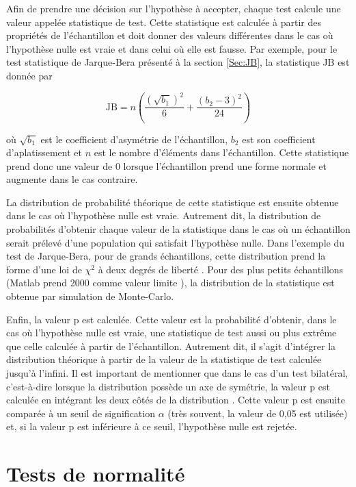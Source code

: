 \documentclass{article}       %
\begin{document}
Afin de prendre une décision sur l'hypothèse à accepter, chaque test calcule une valeur appelée statistique de test. Cette statistique est calculée à partir des propriétés de l'échantillon et doit donner des valeurs différentes dans le cas où l'hypothèse nulle est vraie et dans celui où elle est fausse. Par exemple, pour le test statistique de Jarque-Bera présenté à la section \ref{Sec:JB}, la statistique JB est donnée par \cite{GComp}

\begin{equation}
\label{JB}
    \text{JB} = n\left(\frac{(\sqrt{b_{1}})^{2}}{6} + \frac{(b_{2}-3)^{2}}{24}\right)
\end{equation}

où $\sqrt{b_{1}}$ est le coefficient d'asymétrie de l'échantillon, $b_{2}$ est son coefficient d'aplatissement et $n$ est le nombre d'éléments dans l'échantillon. Cette statistique prend donc une valeur de 0 lorsque l'échantillon prend une forme normale et augmente dans le cas contraire.

La distribution de probabilité théorique de cette statistique est ensuite obtenue dans le cas où l'hypothèse nulle est vraie. Autrement dit, la distribution de probabilités d'obtenir chaque valeur de la statistique dans le cas où un échantillon serait prélevé d'une population qui satisfait l'hypothèse nulle. Dans l'exemple du test de Jarque-Bera, pour de grands échantillons, cette distribution prend la forme d'une loi de $\chi^{2}$ à deux degrés de liberté \cite{JB}. Pour des plus petits échantillons (Matlab prend 2000 comme valeur limite \cite{JBMatlab}), la distribution de la statistique est obtenue par simulation de Monte-Carlo.

Enfin, la valeur p est calculée. Cette valeur est la probabilité d'obtenir, dans le cas où l'hypothèse nulle est vraie, une statistique de test aussi ou plus extrême que celle calculée à partir de l'échantillon. Autrement dit, il s'agit d'intégrer la distribution théorique à partir de la valeur de la statistique de test calculée jusqu'à l'infini. Il est important de mentionner que dans le cas d'un test bilatéral, c'est-à-dire lorsque la distribution possède un axe de symétrie, la valeur p est calculée en intégrant les deux côtés de la distribution \cite{TTTest}. Cette valeur p est ensuite comparée à un seuil de signification $\alpha$ (très souvent, la valeur de 0,05 est utilisée) et, si la valeur p est inférieure à ce seuil, l'hypothèse nulle est rejetée. 

\section{Tests de normalité}
\end{document}
